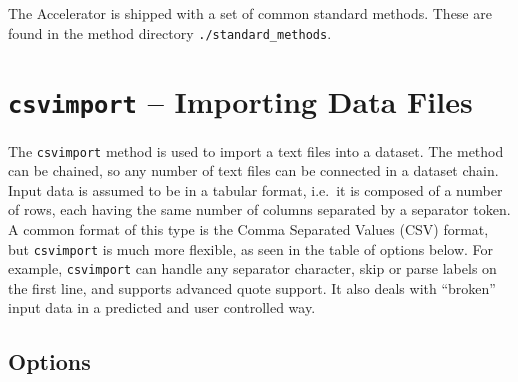 
The Accelerator is shipped with a set of common standard methods.
These are found in the method directory \texttt{./standard\_methods}.

\section{\texttt{csvimport} -- Importing Data Files}

The \texttt{csvimport} method is used to import a text files into a
dataset.  The method can be chained, so any number of text files can
be connected in a dataset chain.  Input data is assumed to be in a
tabular format, i.e.\ it is composed of a number of rows, each having
the same number of columns separated by a separator token.  A common
format of this type is the Comma Separated Values (CSV) format, but
\texttt{csvimport} is much more flexible, as seen in the table of
options below.  For example, \texttt{csvimport} can handle any
separator character, skip or parse labels on the first line, and
supports advanced quote support.  It also deals with ``broken'' input
data in a predicted and user controlled way.



\subsection{Options}

